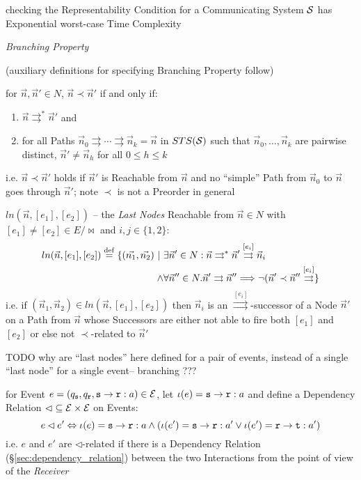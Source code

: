 checking the Representability Condition for a Communicating System
$\mathcal{S}$ has Exponential worst-case Time Complexity


\emph{Branching Property}

(auxiliary definitions for specifying Branching Property follow)

for $\vec{n},\vec{n}' \in N$, $\vec{n} \prec \vec{n}'$ if and only if:
\begin{enumerate}
  \item $\vec{n}\rightrightarrows^*\vec{n}'$ and
  \item for all Paths
    $\vec{n}_0\rightrightarrows\cdots\rightrightarrows\vec{n}_k =
    \vec{n}$ in $STS(\mathcal{S})$ such that
    $\vec{n}_0,\ldots,\vec{n}_k$ are pairwise distinct,
    $\vec{n}'\neq\vec{n}_h$ for all $0 \leq h \leq k$
\end{enumerate}
i.e. $\vec{n} \prec \vec{n}'$ holds if $\vec{n}'$ is Reachable from
$\vec{n}$ and no ``simple'' Path from $\vec{n}_0$ to $\vec{n}$ goes
through $\vec{n}'$; note $\prec$ is not a Preorder in general

$ln(\vec{n},[e_1],[e_2])$ -- the \emph{Last Nodes} Reachable from
$\vec{n} \in N$ with $[e_1] \neq [e_2] \in E/\bowtie$ and $i,j \in
\{1,2\}$:
\begin{align*}
  ln(\vec{n},[e_1],[e_2]) \stackrel{\mathrm{def}}= \{ (\vec{n_1},\vec{n_2}) \ |\ &
    \exists\vec{n}' \in N : \vec{n}\rightrightarrows^*\vec{n}'
        \stackrel{[e_i]}\rightrightarrows\vec{n}_i \\
    \wedge & \forall\vec{n}'' \in N . \vec{n}'\rightrightarrows\vec{n}''
        \Longrightarrow
          \neg(\vec{n}'\prec\vec{n}''\stackrel{[e_i]}\rightrightarrows
  \}
\end{align*}
i.e. if $(\vec{n}_1,\vec{n}_2) \in ln(\vec{n},[e_1],[e_2])$ then
$\vec{n}_i$ is an $\stackrel{[e_i]}\rightrightarrows$-successor of a
Node $\vec{n}'$ on a Path from $\vec{n}$ whose Successors are either
not able to fire both $[e_1]$ and $[e_2]$ or else not $\prec$-related
to $\vec{n}'$

TODO why are ``last nodes'' here defined for a pair of events, instead
of a single ``last node'' for a single event-- branching ???

for Event $e =
(q_\mathtt{s},q_\mathtt{r},\mathtt{s}\rightarrow\mathtt{r}:a) \in
\mathcal{E}$, let $\iota(e) = \mathtt{s}\rightarrow\mathtt{r}:a$ and
define a Dependency Relation $\lhd \subseteq \mathcal{E}\times\mathcal{E}$
on Events:
\[
  e \lhd e' \Leftrightarrow
    \iota(e) = \mathtt{s}\rightarrow\mathtt{r}:a \wedge
    (\iota(e') = \mathtt{s}\rightarrow\mathtt{r}:a' \vee
      \iota(e') = \mathtt{r}\rightarrow\mathtt{t}:a')
\]
i.e. $e$ and $e'$ are $\lhd$-related if there is a Dependency Relation
(\S\ref{sec:dependency_relation}) between the two Interactions from
the point of view of the \emph{Receiver} %

